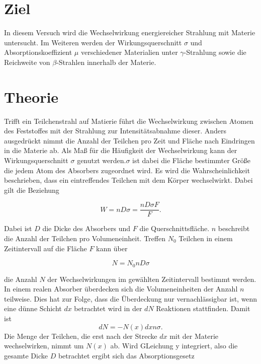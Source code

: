 \section{Ziel}
\label{sec:Ziel}
In diesem Versuch wird die Wechselwirkung energiereicher Strahlung mit Materie untersucht. 
Im Weiteren werden der Wirkungsquerschnitt $\sigma$ und Absorptionskoeffizient $\mu$ verschiedener Materialien unter $\gamma$-Strahlung sowie die Reichweite von $\beta$-Strahlen innerhalb der Materie.

\section{Theorie}
\label{sec:Theorie}
Trifft ein Teilchenstrahl auf Matierie führt die Wechselwirkung zwischen Atomen des Feststoffes mit der Strahlung zur Intensitätsabnahme dieser. Anders ausgedrückt nimmt die Anzahl der Teilchen pro Zeit und Fläche nach Eindringen in die Materie ab. Als Maß für die Häufigkeit der Wechselwirkung kann der Wirkungsquerschnitt $\sigma$ genutzt werden.$\sigma$ ist dabei die Fläche bestimmter Größe die jedem Atom des Absorbers zugeordnet wird. Es wird die Wahrscheinlichkeit beschrieben, dass ein eintreffendes Teilchen mit dem Körper wechselwirkt. Dabei gilt die Beziehung 

\begin{equation}
W=n D \sigma =\frac{n D \sigma F}{F}.
\end{equation}

Dabei ist $D$ die Dicke des Absorbers und $F$ die Querschnittsfläche. $n$ beschreibt die Anzahl der Teilchen pro Volumeneinheit.
Treffen $N_0$ Teilchen in einem Zeitintervall auf die Fläche $F$ kann über

\begin{equation}
N=N_0 n D \sigma
\end{equation}

die Anzahl $N$ der Wechselwirkungen im gewählten Zeitintervall bestimmt werden. 
In einem realen Absorber überdecken sich die Volumeneinheiten der Anzahl $n$ teilweise. Dies hat zur Folge, dass die Überdeckung nur vernachlässigbar ist, wenn eine dünne Schicht $dx$ betrachtet wird in der $dN$ Reaktionen stattfinden. Damit ist
\begin{equation}
dN=-N(x) dx n \sigma.
\end{equation}
Die Menge der Teilchen, die erst nach der Strecke $dx$ mit der Materie wechselwirken, nimmt um $N(x)$ ab. Wird GLeichung y integriert, also die gesamte Dicke $D$ betrachtet ergibt sich das Absorptionsgesetz

